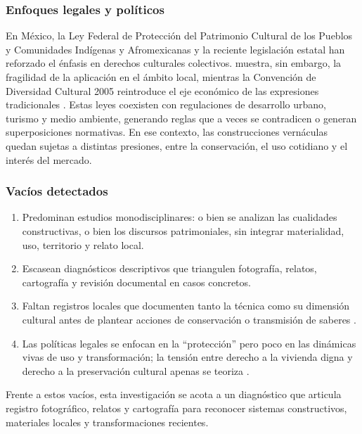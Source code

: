 \subsubsection{Enfoques legales y políticos}

En México, la Ley Federal de Protección del Patrimonio Cultural de los Pueblos y Comunidades Indígenas y Afromexicanas \cite{ley2023patrimonio} y la reciente legislación estatal han reforzado el énfasis en derechos culturales colectivos. \cite{sanchez2013legislacion} muestra, sin embargo, la fragilidad de la aplicación en el ámbito local, mientras la Convención de Diversidad Cultural 2005 reintroduce el eje económico de las expresiones tradicionales \cite{UNESCO2005diversidad}. Estas leyes coexisten con regulaciones de desarrollo urbano, turismo y medio ambiente, generando reglas que a veces se contradicen o generan superposiciones normativas. En ese contexto, las construcciones vernáculas quedan sujetas a distintas presiones, entre la conservación, el uso cotidiano y el interés del mercado.

\subsubsection{Vacíos detectados}

\begin{enumerate}
	\item Predominan estudios monodisciplinares: o bien se analizan las cualidades constructivas, o bien los discursos patrimoniales, sin integrar materialidad, uso, territorio y relato local.

	\item Escasean diagnósticos descriptivos que triangulen fotografía, relatos, cartografía y revisión documental en casos concretos.

	\item Faltan registros locales que documenten tanto la técnica como su dimensión cultural antes de plantear acciones de conservación o transmisión de saberes \citep{torres2021transmision}.

	\item Las políticas legales se enfocan en la ``protección'' pero poco en las dinámicas vivas de uso y transformación; la tensión entre derecho a la vivienda digna y derecho a la preservación cultural apenas se teoriza \citep{herrejon1994}.
\end{enumerate}

Frente a estos vacíos, esta investigación se acota a un diagnóstico que articula registro fotográfico, relatos y cartografía para reconocer sistemas constructivos, materiales locales y transformaciones recientes.
